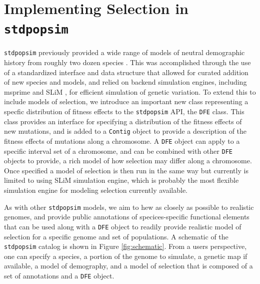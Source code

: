 \documentclass[hidelinks]{article}
\newcommand{\stdpopsim}{\texttt{stdpopsim}\xspace}
\begin{document}
\section*{Implementing Selection in \stdpopsim}
    \label{selection}

    \stdpopsim previously provided a wide range of models of neutral
    demographic history from roughly two dozen species \citep{lauterbur2023expanding}.
    This was accomplished through the use of a standardized interface
    and data structure that allowed for curated addition of new
    species and models, and relied on backend simulation engines,
    including msprime \citep{Baumdicker2022} and SLiM \citep{haller2019slim},
    for efficient simulation of genetic variation.
    To extend this to include models of selection, 
    we introduce an important new class representing a specfic distribution of fitness effects
    to the \stdpopsim API, the \texttt{DFE} class. 
    This class provides an interface for specifying
    a distribution of the fitness effects of new mutations, and
    is added to a \texttt{Contig} object to provide a description
    of the fitness effects of mutations along a chromosome.
    A \texttt{DFE} object can apply to a specific interval set of a chromosome,
    and can be combined with other \texttt{DFE} objects to provide, 
    a rich model of how selection may differ along a chromosome. 
    Once specified a model of selection is then run in the same way
    but currently is limited to using SLiM simulation engine, which
    is probably the most flexible simulation engine for modeling selection currently available.
    
    As with other \stdpopsim models, we aim to hew as closely as possible
    to realistic genomes, and provide public annotations of specices-specific functional
    elements that can be used along with a \texttt{DFE} object to
    readily provide realistic model of selection for a specific genome and set of
    populations. A schematic of the \stdpopsim catalog is shown in Figure \ref{fig:schematic}.
    From a users perspective, one can specify a species, a portion of the genome to simulate,
    a genetic map if available, a model of demography, and a model of selection that is
    composed of a set of annotations and a \texttt{DFE} object. 
\end{document}
